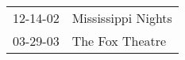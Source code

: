 \begin{supertabular}{p{0.07\textwidth}p{0.23\textwidth}}
 12-14-02 &  Mississippi Nights \\
 03-29-03 &     The Fox Theatre \\
\end{supertabular}
